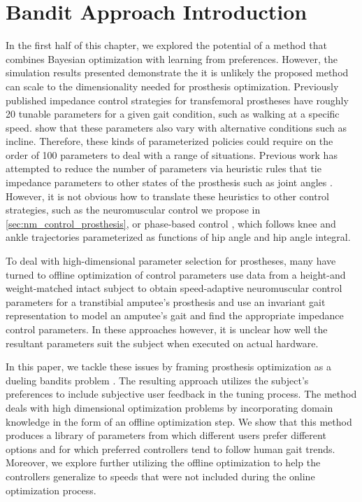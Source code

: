 \section{Bandit Approach Introduction}\label{sec:bandit_intro}

In the first half of this chapter, we explored the potential of a method that
combines Bayesian optimization with learning from preferences. However, the
simulation results presented demonstrate the it is unlikely the proposed method
can scale to the dimensionality needed for prosthesis optimization. Previously
published impedance control strategies for transfemoral prostheses have roughly
20 tunable parameters for a given gait condition, such as walking at a specific
speed. \citet{sup2011upslope} show that these parameters also vary with
alternative conditions such as incline.  Therefore, these kinds of parameterized
policies could require on the order of 100 parameters to deal with a range of
situations. Previous work has attempted to reduce the number of parameters via
heuristic rules that tie impedance parameters to other states of the prosthesis
such as joint angles \citep{simon2014configuring}.  However, it is not obvious
how to translate these heuristics to other control strategies, such as the
neuromuscular control we propose in \cref{sec:nm_control_prosthesis}, or
phase-based control \citep{quintero2016preliminary}, which follows knee and
ankle trajectories parameterized as functions of hip angle and hip angle
integral.

To deal with high-dimensional parameter selection for prostheses, many have
turned to offline optimization of control parameters \citet{markowitz2011speed}
use data from a height-and weight-matched intact subject to obtain
speed-adaptive neuromuscular control parameters for a transtibial amputee's
prosthesis and \citet{aghasadeghi2013learning} use an invariant gait
representation to model an amputee's gait and find the appropriate impedance
control parameters. In these approaches however, it is unclear how well the
resultant parameters suit the subject when executed on actual hardware.

In this paper, we tackle these issues by framing prosthesis optimization as a
dueling bandits problem \citep{yue2012k}. The resulting approach utilizes the
subject's preferences to include subjective user feedback in the tuning process.
The method deals with high dimensional optimization problems by incorporating
domain knowledge in the form of an offline optimization step. We show that this
method produces a library of parameters from which different users prefer
different options and for which preferred controllers tend to follow human gait
trends. Moreover, we explore further utilizing the offline optimization to help
the controllers generalize to speeds that were not included during the online
optimization process.
